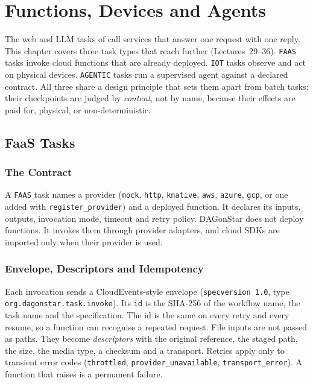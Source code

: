 \chapter{Functions, Devices and Agents}
\label{ch:faas-iot-agentic}

The web and LLM tasks of  call services that
answer one request with one reply. This chapter covers three task types that
reach further (Lectures~29--36). \texttt{FAAS} tasks invoke cloud functions
that are already deployed. \texttt{IOT} tasks observe and act on physical
devices. \texttt{AGENTIC} tasks run a supervised agent against a declared
contract. All three share a design principle that sets them apart from batch
tasks: their checkpoints are judged by \emph{content}, not by name, because
their effects are paid for, physical, or non-deterministic.

\section{FaaS Tasks}

\subsection{The Contract}

A \texttt{FAAS} task names a provider (\texttt{mock}, \texttt{http},
\texttt{knative}, \texttt{aws}, \texttt{azure}, \texttt{gcp}, or one added
with \texttt{register\_provider}) and a deployed function. It declares its
inputs, outputs, invocation mode, timeout and retry policy. DAGonStar does not
deploy functions. It invokes them through provider adapters, and cloud SDKs
are imported only when their provider is used.





\subsection{Envelope, Descriptors and Idempotency}

Each invocation sends a CloudEvents-style envelope (\texttt{specversion 1.0},
type \texttt{org.dagonstar.task.invoke}). Its \texttt{id} is the SHA-256 of
the workflow name, the task name and the specification. The id is the same on
every retry and every resume, so a function can recognise a repeated request.
File inputs are not passed as paths. They become \emph{descriptors} with the
original reference, the staged path, the size, the media type, a checksum and
a transport. Retries apply only to transient error codes (\texttt{throttled},
\texttt{provider\_unavailable}, \texttt{transport\_error}). A function that
raises is a permanent failure.

